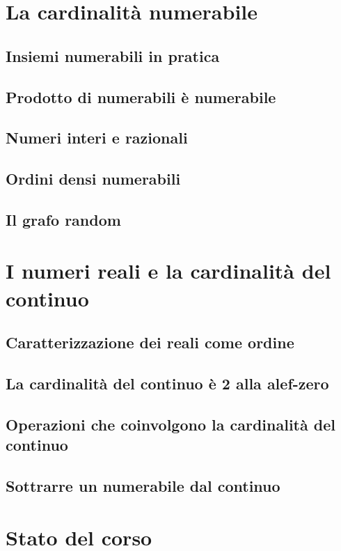 \documentclass[11pt]{scrartcl}
\begin{document}
\newpage
\section{La cardinalità numerabile}
\subsection{Insiemi numerabili in pratica}
\newpage
\subsection{Prodotto di numerabili è numerabile}
\newpage
\subsection{Numeri interi e razionali}
\newpage
\subsection{Ordini densi numerabili}
\newpage
\subsection{Il grafo random}




\newpage
\section{I numeri reali e la cardinalità del continuo}
\subsection{Caratterizzazione dei reali come ordine}
\newpage
\subsection{La cardinalità del continuo è 2 alla alef-zero}
\newpage
\subsection{Operazioni che coinvolgono la cardinalità del continuo}
\newpage
\subsection{Sottrarre un numerabile dal continuo}




\newpage
\section{Stato del corso}
\end{document}
